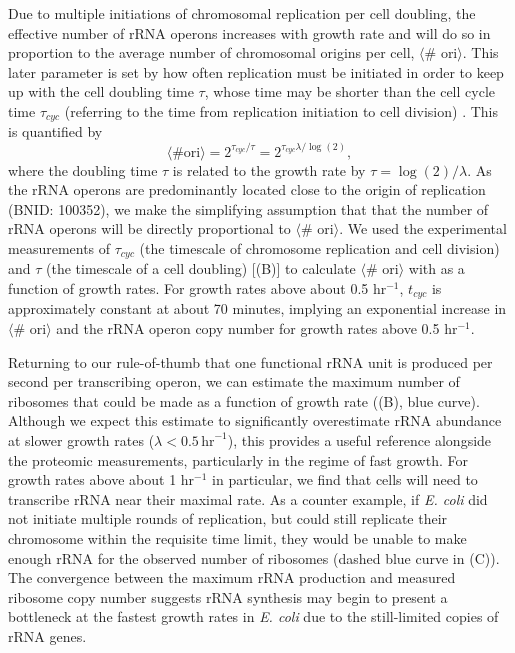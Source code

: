 Due to multiple initiations of chromosomal replication per cell doubling, the
effective number of rRNA operons increases with growth rate and will do so in
proportion to the average number of chromosomal origins per cell, $\langle$\# ori$\rangle$.
This later parameter is set by how often replication must be initiated in order
to keep up with the cell doubling time $\tau$, whose time may be shorter than the
cell cycle time $\tau_{cyc}$ (referring to the time from replication initiation to
cell division) \citep{dennis2004, ho2015}. This is quantified by
\begin{equation}
    \langle \text{\# ori} \rangle = 2^{\tau_{cyc} / \tau} = 2^{\tau_{cyc} \lambda / \log(2)},
    \label{eq:Nori}
\end{equation}
where the doubling time $\tau$ is related to the growth rate by $\tau =
\log(2)/\lambda$. As the rRNA operons are predominantly located close to the
origin of replication (BNID: 100352), we make the simplifying assumption that
that the number of rRNA operons will be directly proportional to $\langle$\#
ori$\rangle$.  We used the experimental measurements of $\tau_{cyc}$ (the
timescale of chromosome replication and cell division) and $\tau$ (the timescale
of a cell doubling)  [(B)] to
calculate $\langle$\# ori$\rangle$  with  as a function of growth
rates. For growth rates above about 0.5 hr$^{-1}$, $t_{cyc}$ is approximately
constant at about 70 minutes, implying an exponential increase in $\langle$\# ori$\rangle$  and
the rRNA operon copy number for growth rates above 0.5 hr$^{-1}$.

Returning to our rule-of-thumb that one functional rRNA unit is produced per
second per transcribing operon, we can estimate the maximum number of ribosomes
that could be made as a function of growth rate ((B), blue
curve). Although we expect this estimate to significantly overestimate rRNA
abundance at slower growth rates ($\lambda < 0.5\, \text{hr}^{-1}$), this
provides a useful reference alongside the proteomic measurements, particularly
in the regime of fast growth. For growth rates above about 1 hr$^{-1}$ in
particular, we find that cells will need to transcribe rRNA near their maximal
rate. As a counter example, if \textit{E. coli} did not initiate multiple rounds
of replication, but could still replicate their chromosome within the requisite
time limit, they would be unable to make enough rRNA for the observed number of
ribosomes (dashed blue curve in (C)). The convergence
between the maximum rRNA production and measured ribosome copy number suggests
rRNA synthesis may begin to present a bottleneck at the fastest growth rates in
\textit{E. coli} due to the still-limited copies of rRNA genes.
